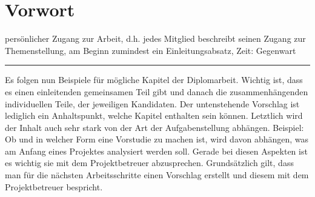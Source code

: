\chapter*{Vorwort}

persönlicher Zugang zur Arbeit, d.h. jedes Mitglied beschreibt seinen Zugang zur Themenstellung, am Beginn zumindest ein Einleitungsabsatz, Zeit: Gegenwart

\rule{\linewidth}{0.5pt}

Es folgen nun Beispiele für mögliche Kapitel der Diplomarbeit.
Wichtig ist, dass es einen einleitenden gemeinsamen Teil gibt und danach die zusammenhängenden individuellen Teile, der jeweiligen Kandidaten.
Der untenstehende Vorschlag ist lediglich ein Anhaltspunkt, welche Kapitel enthalten sein können. 
Letztlich wird der Inhalt auch sehr stark von der Art der Aufgabenstellung abhängen. 
Beispiel: Ob und in welcher Form eine Vorstudie zu machen ist, wird davon abhängen, was am Anfang eines Projektes analysiert werden soll. 
Gerade bei diesen Aspekten ist es wichtig sie mit dem Projektbetreuer abzusprechen. 
Grundsätzlich gilt, dass man für die nächsten Arbeitsschritte einen Vorschlag erstellt und diesem mit dem Projektbetreuer bespricht.
